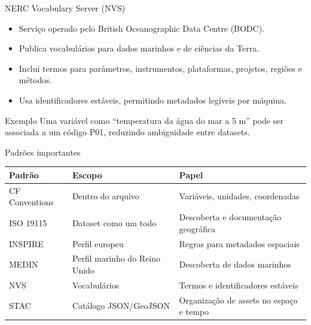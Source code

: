\documentclass[aspectratio=169]{beamer}
\begin{document}
\begin{frame}{NERC Vocabulary Server (NVS)}
\begin{itemize}
  \item Serviço operado pelo British Oceanographic Data Centre (BODC).
  \item Publica vocabulários para dados marinhos e de ciências da Terra.
  \item Inclui termos para parâmetros, instrumentos, plataformas, projetos, regiões e métodos.
  \item Usa identificadores estáveis, permitindo metadados legíveis por máquina.
\end{itemize}

\vspace{0.4cm}

\begin{block}{Exemplo}
Uma variável como ``temperatura da água do mar a 5 m'' pode ser associada a um código P01, reduzindo ambiguidade entre datasets.
\end{block}
\end{frame}

\begin{frame}{Padrões importantes}
\begin{table}
\centering
\small
\begin{tabular}{lll}
\toprule
Padrão & Escopo & Papel \\
\midrule
CF Conventions & Dentro do arquivo & Variáveis, unidades, coordenadas \\
ISO 19115 & Dataset como um todo & Descoberta e documentação geográfica \\
INSPIRE & Perfil europeu & Regras para metadados espaciais \\
MEDIN & Perfil marinho do Reino Unido & Descoberta de dados marinhos \\
NVS & Vocabulários & Termos e identificadores estáveis \\
STAC & Catálogo JSON/GeoJSON & Organização de assets no espaço e tempo \\
\bottomrule
\end{tabular}
\end{table}
\end{frame}
\end{document}
